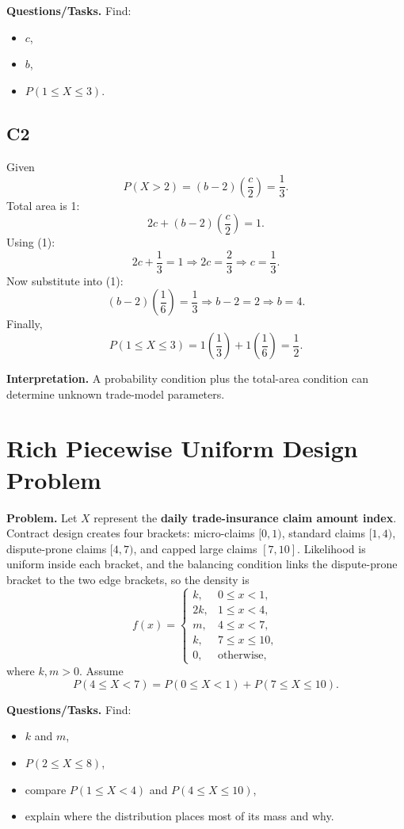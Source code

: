 \textbf{Questions/Tasks.}
Find:
\begin{itemize}
    \item[(a)] $c$,
    \item[(b)] $b$,
    \item[(c)] $P(1\le X\le 3)$.
\end{itemize}

\subsection*{C2}
Given
\[
P(X>2)=(b-2)\left(\frac{c}{2}\right)=\frac{1}{3}. \tag{1}
\]
Total area is 1:
\[
2c+(b-2)\left(\frac{c}{2}\right)=1.
\]
Using (1):
\[
2c+\frac{1}{3}=1 \Rightarrow 2c=\frac{2}{3} \Rightarrow c=\frac{1}{3}.
\]
Now substitute into (1):
\[
(b-2)\left(\frac{1}{6}\right)=\frac{1}{3}
\Rightarrow b-2=2
\Rightarrow b=4.
\]
Finally,
\[
P(1\le X\le 3)=1\left(\frac{1}{3}\right)+1\left(\frac{1}{6}\right)=\frac{1}{2}.
\]

\textbf{Interpretation.}
A probability condition plus the total-area condition can determine unknown trade-model parameters.

\section{Rich Piecewise Uniform Design Problem}

\textbf{Problem.}
Let $X$ represent the \textbf{daily trade-insurance claim amount index}. Contract design creates four brackets: micro-claims $[0,1)$, standard claims $[1,4)$, dispute-prone claims $[4,7)$, and capped large claims $[7,10]$. Likelihood is uniform inside each bracket, and the balancing condition links the dispute-prone bracket to the two edge brackets, so the density is
\[
f(x)=
\begin{cases}
k, & 0\le x<1,\\
2k, & 1\le x<4,\\
m, & 4\le x<7,\\
k, & 7\le x\le 10,\\
0, & \text{otherwise,}
\end{cases}
\]
where $k,m>0$. Assume
\[
P(4\le X<7)=P(0\le X<1)+P(7\le X\le 10).
\]

\textbf{Questions/Tasks.}
Find:
\begin{itemize}
    \item[(a)] $k$ and $m$,
    \item[(b)] $P(2\le X\le 8)$,
    \item[(c)] compare $P(1\le X<4)$ and $P(4\le X\le 10)$,
    \item[(d)] explain where the distribution places most of its mass and why.
\end{itemize}


